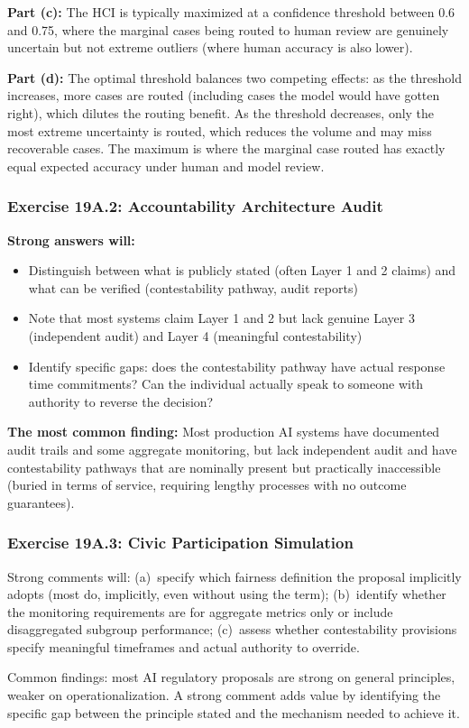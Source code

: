 \textbf{Part (c):} The HCI is typically maximized at a confidence threshold between 0.6 and 0.75, where the marginal cases being routed to human review are genuinely uncertain but not extreme outliers (where human accuracy is also lower).

\textbf{Part (d):} The optimal threshold balances two competing effects: as the threshold increases, more cases are routed (including cases the model would have gotten right), which dilutes the routing benefit. As the threshold decreases, only the most extreme uncertainty is routed, which reduces the volume and may miss recoverable cases. The maximum is where the marginal case routed has exactly equal expected accuracy under human and model review.

\subsubsection*{Exercise 19A.2: Accountability Architecture Audit}

\textbf{Strong answers will:}
\begin{itemize}
    \item Distinguish between what is publicly stated (often Layer 1 and 2 claims) and what can be verified (contestability pathway, audit reports)
    \item Note that most systems claim Layer 1 and 2 but lack genuine Layer 3 (independent audit) and Layer 4 (meaningful contestability)
    \item Identify specific gaps: does the contestability pathway have actual response time commitments? Can the individual actually speak to someone with authority to reverse the decision?
\end{itemize}

\textbf{The most common finding:} Most production AI systems have documented audit trails and some aggregate monitoring, but lack independent audit and have contestability pathways that are nominally present but practically inaccessible (buried in terms of service, requiring lengthy processes with no outcome guarantees).

\subsubsection*{Exercise 19A.3: Civic Participation Simulation}

Strong comments will: (a)~specify which fairness definition the proposal implicitly adopts (most do, implicitly, even without using the term); (b)~identify whether the monitoring requirements are for aggregate metrics only or include disaggregated subgroup performance; (c)~assess whether contestability provisions specify meaningful timeframes and actual authority to override.

Common findings: most AI regulatory proposals are strong on general principles, weaker on operationalization. A strong comment adds value by identifying the specific gap between the principle stated and the mechanism needed to achieve it.
